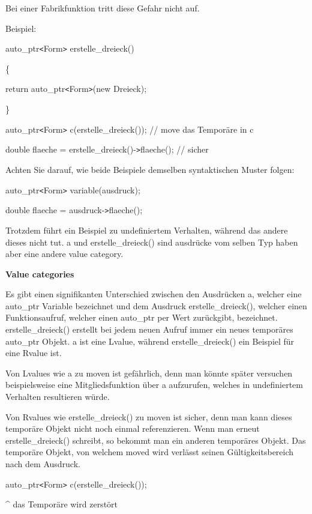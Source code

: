 \documentclass{article}
\begin{document}
Bei einer Fabrikfunktion tritt diese Gefahr nicht auf.

Beispiel:

auto\_ptr\texttt{<}Form\texttt{>} erstelle\_dreieck()

\{    

\parindent=14pt
return auto\_ptr\texttt{<}Form\texttt{>}(new Dreieck);

\parindent=0pt
\}

auto\_ptr\texttt{<}Form\texttt{>} c(erstelle\_dreieck()); // move das Temporäre 
in c

double flaeche = erstelle\_dreieck()-\texttt{>}flaeche(); // sicher

Achten Sie darauf, wie beide Beispiele demselben syntaktischen Muster folgen:

auto\_ptr\texttt{<}Form\texttt{>} variable(ausdruck);

double flaeche = ausdruck-\texttt{>}flaeche();

Trotzdem führt ein Beispiel zu undefiniertem Verhalten, während das andere dieses 
nicht tut. a und erstelle\_dreieck() sind ausdrücke vom selben Typ haben aber 
eine andere value category.

\vspace{12pt}
\textbf{Value categories}

Es gibt einen signifikanten Unterschied zwischen den Ausdrücken a, welcher eine 
auto\_ptr Variable bezeichnet und dem Ausdruck erstelle\_dreieck(), welcher einen 
Funktionsaufruf, welcher einen auto\_ptr per Wert zurückgibt, bezeichnet. erstelle\_dreieck() 
erstellt bei jedem neuen Aufruf immer ein neues temporäres auto\_ptr Objekt. a 
ist eine Lvalue, während erstelle\_dreieck() ein Beispiel für eine Rvalue ist.

Von Lvalues wie a zu moven ist gefährlich, denn man könnte später versuchen 
beispielsweise eine Mitgliedsfunktion über a aufzurufen, welches in undefiniertem 
Verhalten resultieren würde.

Von Rvalues wie erstelle\_dreieck() zu moven ist sicher, denn man kann dieses temporäre 
Objekt nicht noch einmal referenzieren. Wenn man erneut erstelle\_dreieck() schreibt, 
so bekommt man ein anderen temporäres Objekt. Das temporäre Objekt, von welchem 
moved wird verlässt seinen Gültigkeitsbereich nach dem Ausdruck.

auto\_ptr\texttt{<}Form\texttt{>} c(erstelle\_dreieck());       

\parindent=115pt
\textasciicircum{} das Temporäre wird zerstört
\end{document}
